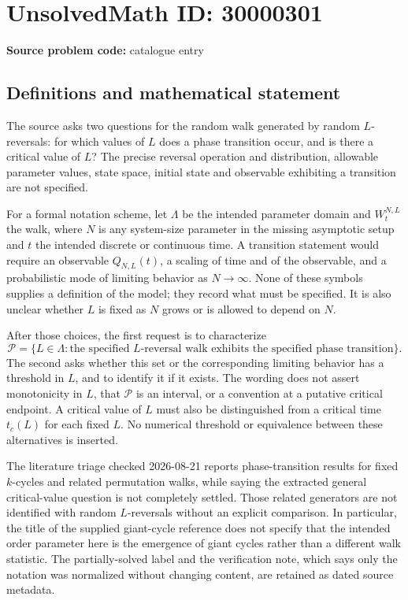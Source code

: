 \documentclass[11pt]{article}
\begin{document}
\section*{UnsolvedMath ID: 30000301}
\textbf{Source problem code:} catalogue entry
\subsection{Definitions and mathematical statement}
The source asks two questions for the random walk generated by random \(L\)-reversals: for which values of \(L\) does a phase transition occur, and is there a critical value of \(L\)? The precise reversal operation and distribution, allowable parameter values, state space, initial state and observable exhibiting a transition are not specified.

For a formal notation scheme, let \(\Lambda\) be the intended parameter domain and \(W^{N,L}_t\) the walk, where \(N\) is any system-size parameter in the missing asymptotic setup and \(t\) the intended discrete or continuous time. A transition statement would require an observable \(Q_{N,L}(t)\), a scaling of time and of the observable, and a probabilistic mode of limiting behavior as \(N\to\infty\). None of these symbols supplies a definition of the model; they record what must be specified. It is also unclear whether \(L\) is fixed as \(N\) grows or is allowed to depend on \(N\).

After those choices, the first request is to characterize
\[
 \mathcal P=\{L\in\Lambda:\text{the specified }L\text{-reversal walk exhibits the specified phase transition}\}.
\]
The second asks whether this set or the corresponding limiting behavior has a threshold in \(L\), and to identify it if it exists. The wording does not assert monotonicity in \(L\), that \(\mathcal P\) is an interval, or a convention at a putative critical endpoint. A critical value of \(L\) must also be distinguished from a critical time \(t_c(L)\) for each fixed \(L\). No numerical threshold or equivalence between these alternatives is inserted.

The literature triage checked 2026-08-21 reports phase-transition results for fixed \(k\)-cycles and related permutation walks, while saying the extracted general critical-value question is not completely settled. Those related generators are not identified with random \(L\)-reversals without an explicit comparison. In particular, the title of the supplied giant-cycle reference does not specify that the intended order parameter here is the emergence of giant cycles rather than a different walk statistic. The partially-solved label and the verification note, which says only the notation was normalized without changing content, are retained as dated source metadata.
\end{document}
